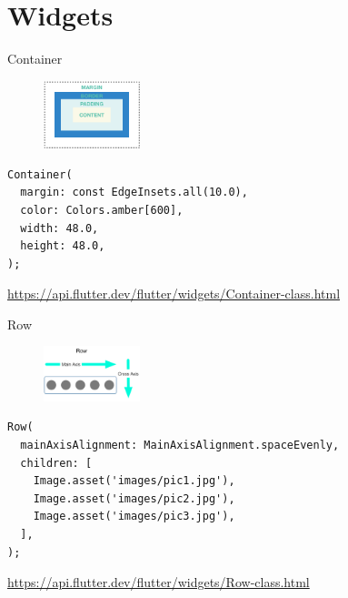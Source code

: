 \section{Widgets}

\begin{frame}[containsverbatim]{Container}

  \begin{figure}[h]
    \includegraphics[width=0.25\textwidth]{images/margin-padding-border.png}
  \end{figure}

  \begin{verbatim}
Container(
  margin: const EdgeInsets.all(10.0),
  color: Colors.amber[600],
  width: 48.0,
  height: 48.0,
);
	\end{verbatim}
  \footnotesize
  \url{https://api.flutter.dev/flutter/widgets/Container-class.html}
\end{frame}


\begin{frame}[containsverbatim]{Row}

  \begin{figure}[h]
    \includegraphics[width=0.25\textwidth]{images/row-diagram.png}
  \end{figure}

  \begin{verbatim}
Row(
  mainAxisAlignment: MainAxisAlignment.spaceEvenly,
  children: [
    Image.asset('images/pic1.jpg'),
    Image.asset('images/pic2.jpg'),
    Image.asset('images/pic3.jpg'),
  ],
);
  \end{verbatim}
  \footnotesize
  \url{https://api.flutter.dev/flutter/widgets/Row-class.html}
\end{frame}

